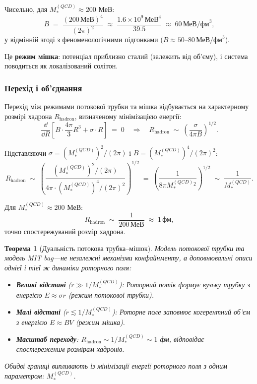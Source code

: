 \documentclass[11pt,a4paper]{article}
\theoremstyle{definition}
\theoremstyle{plain}
\newtheorem{theorem}{Теорема}[section]
\theoremstyle{remark}
\begin{document}
Чисельно, для $M_*^{(QCD)} \approx 200$ МеВ:
\begin{equation}
B \;=\; \frac{(200\,\text{МеВ})^4}{(2\pi)^2} \;\approx\; \frac{1{.}6 \times 10^9\,\text{МеВ}^4}{39{.}5} \;\approx\; 60\,\text{МеВ/фм}^3,
\end{equation}
у відмінній згоді з феноменологічними підгонками ($B \approx 50$--$80\,\text{МеВ/фм}^3$).

Це \textbf{режим мішка}: потенціал приблизно сталий (залежить від об'єму), і система поводиться як локалізований солітон.

\subsubsection{Перехід і об'єднання}

Перехід між режимами потокової трубки та мішка відбувається на характерному розмірі хадрона $R_{\mathrm{hadron}}$, визначеному мінімізацією енергії:
\begin{equation}
\frac{\dd}{\dd R}\left[B \cdot \frac{4\pi}{3}R^3 + \sigma \cdot R\right] \;=\; 0 \quad\Rightarrow\quad R_{\mathrm{hadron}} \;\sim\; \left(\frac{\sigma}{4\pi B}\right)^{1/2}.
\end{equation}

Підставляючи $\sigma = (M_*^{(QCD)})^2 / (2\pi)$ і $B = (M_*^{(QCD)})^4 / (2\pi)^2$:
\begin{equation}
R_{\mathrm{hadron}} \;\sim\; \left(\frac{(M_*^{(QCD)})^2 / (2\pi)}{4\pi \cdot (M_*^{(QCD)})^4 / (2\pi)^2}\right)^{1/2} \;=\; \left(\frac{1}{8\pi M_*^{(QCD)} {}^2}\right)^{1/2} \;\sim\; \frac{1}{M_*^{(QCD)}}.
\end{equation}

Для $M_*^{(QCD)} \approx 200$ МеВ:
\begin{equation}
R_{\mathrm{hadron}} \;\sim\; \frac{1}{200\,\text{МеВ}} \;\approx\; 1\,\text{фм},
\end{equation}
точно спостережуваний розмір хадрона.

\begin{theorem}[Дуальність потокова трубка–мішок]
Модель потокової трубки та модель MIT bag—не незалежні механізми конфайнменту, а доповнювальні описи однієї і тієї ж динаміки роторного поля:
\begin{itemize}[leftmargin=*,itemsep=3pt]
  \item \textbf{Великі відстані} ($r \gg 1/M_*^{(QCD)}$): Роторний потік формує вузьку трубку з енергією $E \approx \sigma r$ (режим потокової трубки).
  \item \textbf{Малі відстані} ($r \lesssim 1/M_*^{(QCD)}$): Роторне поле заповнює когерентний об'єм з енергією $E \approx B V$ (режим мішка).
  \item \textbf{Масштаб переходу}: $R_{\mathrm{hadron}} \sim 1/M_*^{(QCD)} \sim 1$ фм, відповідає спостереженим розмірам хадронів.
\end{itemize}
Обидві границі випливають із мінімізації енергії роторного поля з одним параметром: $M_*^{(QCD)}$.
\end{theorem}
\end{document}
